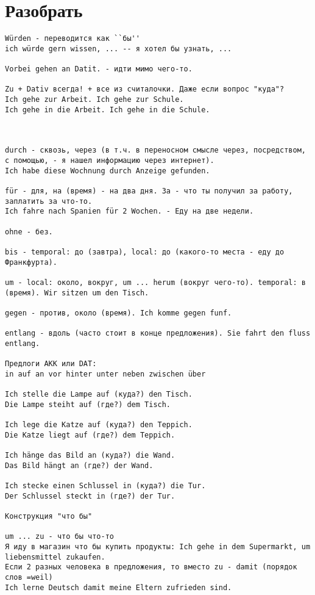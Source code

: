 \documentclass[12pt,a4paper]{report}
\begin{document}
\chapter{Разобрать}
\begin{verbatim}
Würden - переводится как ``бы''
ich würde gern wissen, ... -- я хотел бы узнать, ...

Vorbei gehen an Datit. - идти мимо чего-то.

Zu + Dativ всегда! + все из считалочки. Даже если вопрос "куда"?
Ich gehe zur Arbeit. Ich gehe zur Schule.
Ich gehe in die Arbeit. Ich gehe in die Schule.



durch - сквозь, через (в т.ч. в переносном смысле через, посредством, с помощью, - я нашел информацию через интернет).
Ich habe diese Wochnung durch Anzeige gefunden.

für - для, на (время) - на два дня. За - что ты получил за работу, заплатить за что-то.
Ich fahre nach Spanien für 2 Wochen. - Еду на две недели.

ohne - без.

bis - temporal: до (завтра), local: до (какого-то места - еду до Франкфурта).

um - local: около, вокруг, um ... herum (вокруг чего-то). temporal: в (время). Wir sitzen um den Tisch.

gegen - против, около (время). Ich komme gegen funf.

entlang - вдоль (часто стоит в конце предложения). Sie fahrt den fluss entlang.

Предлоги AKK или DAT:
in auf an vor hinter unter neben zwischen über

Ich stelle die Lampe auf (куда?) den Tisch.
Die Lampe steiht auf (где?) dem Tisch.

Ich lege die Katze auf (куда?) den Teppich.
Die Katze liegt auf (где?) dem Teppich.

Ich hänge das Bild an (куда?) die Wand.
Das Bild hängt an (где?) der Wand.

Ich stecke einen Schlussel in (куда?) die Tur.
Der Schlussel steckt in (где?) der Tur.

Конструкция "что бы"

um ... zu - что бы что-то
Я иду в магазин что бы купить продукты: Ich gehe in dem Supermarkt, um liebensmittel zukaufen.
Если 2 разных человека в предложения, то вместо zu - damit (порядок слов =weil)
Ich lerne Deutsch damit meine Eltern zufrieden sind.




\end{verbatim}
\end{document}

